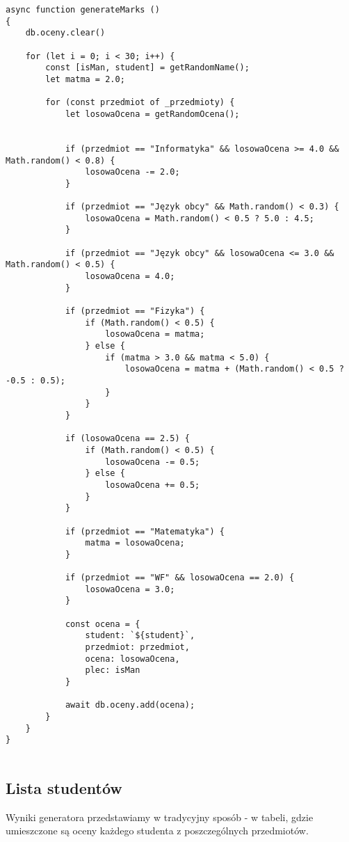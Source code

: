 \begin{empty}
	\begin{verbatim}
async function generateMarks ()
{
	db.oceny.clear()
	
	for (let i = 0; i < 30; i++) {
		const [isMan, student] = getRandomName();
		let matma = 2.0;
		
		for (const przedmiot of _przedmioty) {
			let losowaOcena = getRandomOcena();
			
			
			if (przedmiot == "Informatyka" && losowaOcena >= 4.0 && Math.random() < 0.8) {
				losowaOcena -= 2.0;
			}
			
			if (przedmiot == "Język obcy" && Math.random() < 0.3) {
				losowaOcena = Math.random() < 0.5 ? 5.0 : 4.5;
			}
			
			if (przedmiot == "Język obcy" && losowaOcena <= 3.0 && Math.random() < 0.5) {
				losowaOcena = 4.0;
			}
			
			if (przedmiot == "Fizyka") {
				if (Math.random() < 0.5) {
					losowaOcena = matma;
				} else {
					if (matma > 3.0 && matma < 5.0) {
						losowaOcena = matma + (Math.random() < 0.5 ? -0.5 : 0.5);
					}
				}
			}
			
			if (losowaOcena == 2.5) {
				if (Math.random() < 0.5) {
					losowaOcena -= 0.5;
				} else {
					losowaOcena += 0.5;
				}
			}
			
			if (przedmiot == "Matematyka") {
				matma = losowaOcena;
			}
			
			if (przedmiot == "WF" && losowaOcena == 2.0) {
				losowaOcena = 3.0;
			}
			
			const ocena = {
				student: `${student}`,
				przedmiot: przedmiot,
				ocena: losowaOcena,
				plec: isMan
			}
			
			await db.oceny.add(ocena);
		}
	}
}
		
	\end{verbatim}
	\vspace{-10pt}
\end{empty}

\subsection{Lista studentów}
Wyniki generatora przedstawiamy w tradycyjny sposób - w tabeli, gdzie umieszczone są oceny każdego studenta z poszczególnych przedmiotów.

